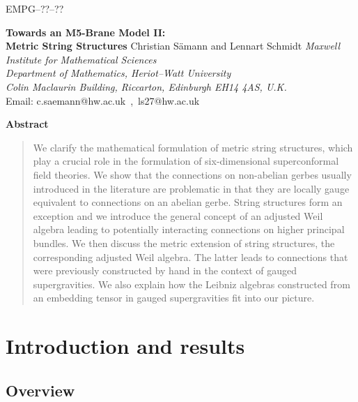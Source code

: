 \documentclass[reqno,a4paper,11pt]{article}
\begin{document}
\begin{titlepage}
\begin{flushright}
 EMPG--??--??
\end{flushright}
\vskip2.0cm
\begin{center}
{\LARGE \bf Towards an M5-Brane Model II:\\[0.3cm] Metric String Structures}
\vskip1.5cm
{\Large Christian S\"amann and Lennart Schmidt}
\setcounter{footnote}{0}
\renewcommand{\thefootnote}{\arabic{thefootnote}}
\vskip1cm
{\em Maxwell Institute for Mathematical Sciences\\
Department of Mathematics, Heriot--Watt University\\
Colin Maclaurin Building, Riccarton, Edinburgh EH14 4AS, U.K.}\\[0.5cm]
{Email: {\ttfamily c.saemann@hw.ac.uk~,~ls27@hw.ac.uk}}
\end{center}
\vskip1.0cm
\begin{center}
{\bf Abstract}
\end{center}
\begin{quote}
We clarify the mathematical formulation of metric string structures, which play a crucial role in the formulation of six-dimensional superconformal field theories. We show that the connections on non-abelian gerbes usually introduced in the literature are problematic in that they are locally gauge equivalent to connections on an abelian gerbe. String structures form an exception and we introduce the general concept of an adjusted Weil algebra leading to potentially interacting connections on higher principal bundles. We then discuss the metric extension of string structures, the corresponding adjusted Weil algebra. The latter leads to connections that were previously constructed by hand in the context of gauged supergravities. We also explain how the Leibniz algebras constructed from an embedding tensor in gauged supergravities fit into our picture.
\end{quote}
\end{titlepage}

\tableofcontents

\section{Introduction and results}

\subsection{Overview}
\end{document}
